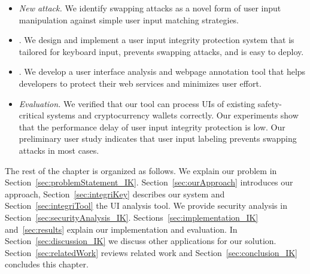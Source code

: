 \begin{itemize}
    \item \emph{New attack.} We identify swapping attacks as a novel form of user input manipulation against simple user input matching strategies.
    \item \name. We design and implement a user input integrity protection system that is tailored for keyboard input, prevents swapping attacks, and is easy to deploy.
    \item \tool. We develop a user interface analysis and webpage annotation tool that helps developers to protect their web services and minimizes user effort.
    \item \emph{Evaluation.} We verified that our tool can process UIs of existing safety-critical systems and cryptocurrency wallets correctly. Our experiments show that the performance delay of \name user input integrity protection is low. Our preliminary user study indicates that user input labeling prevents swapping attacks in most cases.
\end{itemize}


 The rest of the chapter is organized as follows. We explain our problem in Section~\ref{sec:problemStatement_IK}. Section~\ref{sec:ourApproach} introduces our approach, Section~\ref{sec:integriKey} describes our system and Section~\ref{sec:integriTool} the UI analysis tool. We provide security analysis in Section~\ref{sec:securityAnalysis_IK}. Sections~\ref{sec:implementation_IK} and~\ref{sec:results} explain our implementation and evaluation. In Section~\ref{sec:discussion_IK} we discuss other applications for our solution. Section~\ref{sec:relatedWork} reviews related work and Section~\ref{sec:conclusion_IK} concludes this chapter.



